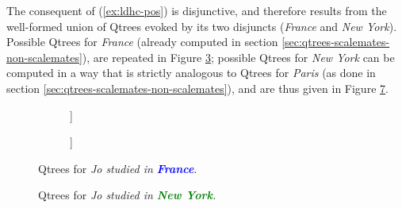 The consequent of (\ref{ex:ldhc-pos}) is disjunctive, and therefore results from the well-formed union of Qtrees evoked by its two disjuncts (\textit{France} and \textit{New York}). Possible Qtrees for \textit{France} (already computed in section \ref{sec:qtrees-scalemates-non-scalemates}), are repeated in Figure \ref{trees:france-2}; possible Qtrees for \textit{New York} can be computed in a way that is strictly analogous to Qtrees for \textit{Paris} (as done in section \ref{sec:qtrees-scalemates-non-scalemates}), and are thus given in Figure \ref{trees:new-york}.
\begin{figure}[H]
	\centering
	\begin{subfigure}[b]{.3\linewidth}
		\centering
		\begin{forest}
			[CS[\bfbox{France}][$\neg$France]]
		\end{forest}
		\caption{}\label{tree:france-polar-2}
	\end{subfigure}
	\qquad
	\begin{subfigure}[b]{.3\linewidth}
		\centering
		\begin{forest}
			[CS[\bfbox{France}][US][...]]
		\end{forest}
		\caption{}\label{tree:france-wh-2}
	\end{subfigure}
	\caption{Qtrees for \textit{Jo studied in \textbf{\textcolor{blue}{France}}}.} \label{trees:france-2}
\end{figure}

\begin{figure}[H]
	\centering
	\begin{subfigure}[b]{.3\linewidth}
		\centering
		\caption{}\label{tree:new-york-polar}
	\end{subfigure}
	\hfill
	\begin{subfigure}[b]{.3\linewidth}
		\centering
		\caption{}\label{tree:new-york-wh}
	\end{subfigure}\hfill
	\begin{subfigure}[b]{.3\linewidth}
		\centering
		\caption{}\label{tree:new-york-tiered}
	\end{subfigure}
	
	
	\caption{Qtrees for \textit{Jo studied in \textbf{\textcolor{green}{New York}}.}}\label{trees:new-york}
\end{figure}

